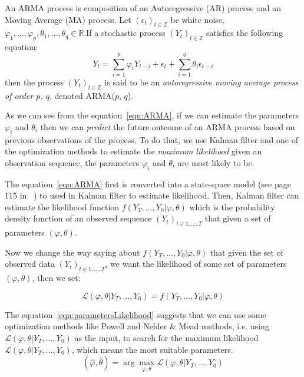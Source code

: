 \documentclass[12pt]{article}
\begin{document}
 An ARMA process is composition of an Autoregressive (AR) process and an Moving
 Average (MA) process. Let $(\epsilon_t)_{t\in \mathbb{Z}}$ be white noise,
 $\varphi_1, \ldots, \varphi_p, \theta_1, \ldots, \theta_q\in\mathbb{R}$.If a
stochastic process $(Y_t)_{t\in \mathbb{Z}}$ satisfies the following
 equation:
 \begin{equation}\label{eqn:ARMA}
 Y_t=\sum_{i=1}^{p}\varphi_iY_{t-i}+
 \epsilon_t +\sum_{i=1}^{q}\theta_i\epsilon_{t-i}
 \end{equation}
then the process $(Y_t)_{t\in \mathbb{Z}}$ is said to be
an \textit{autoregressive moving average process of order $p$, $q$}, denoted
ARMA($p$, $q$).

As we can see from the equation~\ref{eqn:ARMA}, if we can estimate the
parameters $\varphi_i$ and $\theta_i$ then we can \textit{predict} the future
outcome of an ARMA process based on previous observations of the process. To do
that, we use Kalman filter and one of the optimization methods to estimate the
\textit{maximum likelihood} given an observation sequence, the parameters
$\varphi_i$ and $\theta_i$ are most likely to be.

The equation~\ref{eqn:ARMA} first is converted into a state-space model (see
page 115 in~\cite{FalkStatSAS} ) to used in Kalman filter to estimate
likelihood. Then, Kalman filter can estimate the likelihood function
$f(Y_T,\ldots, Y_0|\varphi, \theta)$ which is the probability density
function of an observed sequence $(Y_t)_{t\in 1, \ldots, T}$ that given a set of
parameters $(\varphi, \theta)$.

Now we change the way saying about $f(Y_T,\ldots,Y_0|\varphi, \theta)$ that
given the set of observed data $(Y_t)_{t\in 1, \ldots, T}$, we want the likelihood of
some set of parameters $(\varphi, \theta)$, then we set:

\begin{equation}\label{eqn:parametersLikelihood}
\mathcal{L}(\varphi, \theta|Y_T,\ldots, Y_0) = f(Y_T,\ldots,Y_0|\varphi,
\theta)
\end{equation}

The equation~\ref{eqn:parametersLikelihood} suggests that we can use some
optimization methods like Powell and Nelder \& Mead methods, i.e. using
$\mathcal{L}(\varphi, \theta|Y_T,\ldots, Y_0)$ as the input, to search for the
maximum likelihood $\mathcal{L}(\varphi, \theta|Y_T,\ldots, Y_0)$, which means
the most suitable parameters.
\begin{equation}
(\hat{\varphi},\hat{\theta})=\arg\max_{\varphi, \theta} \mathcal{L}(\varphi,
\theta|Y_T,\ldots, Y_0)
\end{equation}
\end{document}
